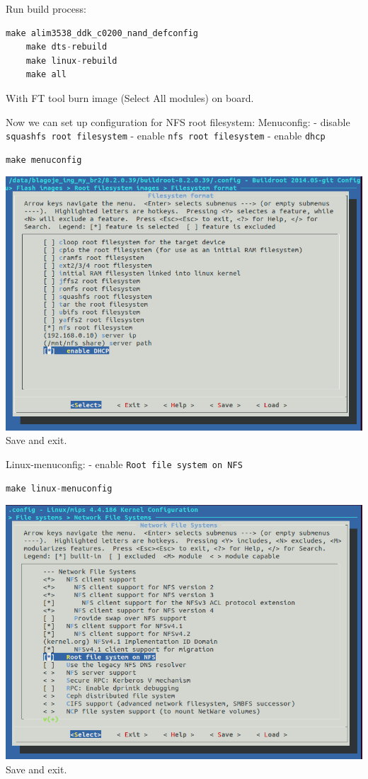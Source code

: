 \documentclass[12pt]{report}
\newcommand{\code}[1]{\texttt{#1}} %
\begin{document}
Run build process:
\begin{lstlisting}[language=C]
    make alim3538_ddk_c0200_nand_defconfig
    make dts-rebuild
    make linux-rebuild
    make all
\end{lstlisting}

With FT tool burn image (Select All modules) on board.\newline

Now we can set up configuration for NFS root filesystem:\newline
Menuconfig:\newline
- disable \code{squashfs root filesystem}\newline
- enable \code{nfs root filesystem} \newline
- enable \code{dhcp} \newline
\begin{lstlisting}[language=C]
    make menuconfig
\end{lstlisting}
\includegraphics[scale=0.55]{3.PNG}
Save and exit.\newline

Linux-menuconfig:\newline
- enable \code{Root file system on NFS}
\begin{lstlisting}[language=C]
    make linux-menuconfig
\end{lstlisting}
\includegraphics[scale=0.55]{4.PNG}
Save and exit.\newline
\end{document}
